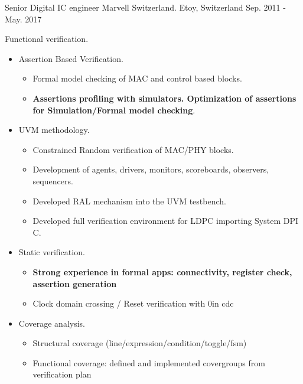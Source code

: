 \begin{cventries}
  \cventry
    {Senior Digital IC engineer} %
    {Marvell Switzerland.} %
    {Etoy, Switzerland} %
    {Sep. 2011 - May. 2017} %
    {
      \begin{cvitems} %
        \item {Functional verification.}
        \begin{itemize}
          \item {Assertion Based Verification.}
          \begin{itemize}
            \item {Formal model checking of MAC and control based blocks.}
            \item {\textbf{Assertions profiling with simulators. Optimization of assertions for Simulation/Formal model checking}.}
          \end{itemize}
          \item {UVM methodology.}
          \begin{itemize}
            \item {Constrained Random verification of MAC/PHY blocks.}
            \item {Development of agents, drivers, monitors, scoreboards, observers, sequencers.}
            \item {Developed RAL mechanism into the UVM testbench.}
            \item {Developed full verification environment for LDPC importing System DPI C.}
          \end{itemize}
          \item {Static verification.}
          \begin{itemize}
            \item {\textbf{Strong experience in formal apps: connectivity, register check, assertion generation}}
            \item {Clock domain crossing / Reset verification with 0in cdc}
          \end{itemize}
          \item {Coverage analysis.}
          \begin{itemize}
            \item {Structural coverage (line/expression/condition/toggle/fsm)}
            \item {Functional coverage: defined and implemented covergroups from verification plan}

\end{itemize}
\end{itemize}
\end{cvitems}}
\end{cventries}
